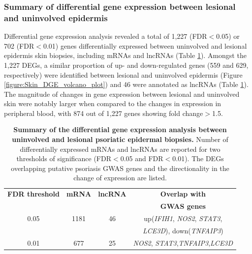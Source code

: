 \subsubsection{Summary of differential gene expression between lesional and uninvolved epidermis}

Differential gene expression analysis revealed a total of 1,227 (FDR$<$0.05) or 702 (FDR$<$0.01) genes differentially expressed between uninvolved and lesional epidermis skin biopsies, including mRNAs and lncRNAs (Table \ref{tab:RNAseq_PS_lesional_uninvolved_DGE_results}). Amongst the 1,227 DEGs, a similar proportion of up- and down-regulated genes (559 and 629, respectively) were identified between lesional and uninvolved epidermis (Figure \ref{figure:Skin_DGE_volcano_plot}) and 46 were annotated as lncRNAs (Table \ref{tab:RNAseq_PS_lesional_uninvolved_DGE_results}). The magnitude of changes in gene expression between lesional and uninvolved skin were notably larger when compared to the changes in expression in peripheral blood, with 874 out of 1,227 genes showing fold change$>$1.5.  


\begin{table}[htbp]
\centering
\begin{tabular}{@{} c c c c}
\toprule
\textbf{FDR threshold}   & \textbf{mRNA}   & \textbf{lncRNA}  & \textbf{Overlap with}\\
                         &                 &                  & \textbf{GWAS genes}\\
\midrule
\midrule
0.05                     & 1181            & 46               &  up(\textit{IFIH1}, \textit{NOS2}, \textit{STAT3},\\ 
                         &                 &                  &  \textit{LCE3D}), down(\textit{TNFAIP3}) \\
0.01                     &  677            & 25               &  \textit{NOS2}, \textit{STAT3},\textit{TNFAIP3},\textit{LCE3D} \\
\bottomrule 
\end{tabular}
\medskip %
\caption[Summary of the differential gene expression analysis between uninvolved and lesional psoriatic epidermal biopsies.]{\textbf{Summary of the differential gene expression analysis between uninvolved and lesional psoriatic epidermal biopsies.} Number of differentially expressed mRNAs and lncRNAs are reported for two thresholds of significance (FDR$<$0.05 and FDR$<$0.01). The DEGs overlapping putative psoriasis GWAS genes and the directionality in the change of expression are listed.}
\label{tab:RNAseq_PS_lesional_uninvolved_DGE_results}
\end{table}
\bigskip %



